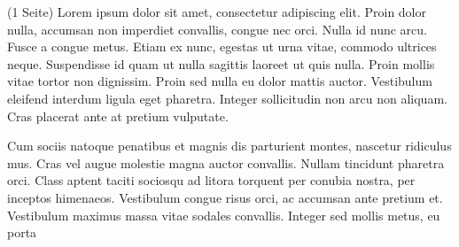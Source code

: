 (1 Seite)
Lorem ipsum dolor sit amet, consectetur adipiscing elit. Proin dolor nulla, accumsan non imperdiet convallis, congue nec orci. Nulla id nunc arcu. Fusce a congue metus. Etiam ex nunc, egestas ut urna vitae, commodo ultrices neque. Suspendisse id quam ut nulla sagittis laoreet ut quis nulla. Proin mollis vitae tortor non dignissim. Proin sed nulla eu dolor mattis auctor. Vestibulum eleifend interdum ligula eget pharetra. Integer sollicitudin non arcu non aliquam. Cras placerat ante at pretium vulputate.

Cum sociis natoque penatibus et magnis dis parturient montes, nascetur ridiculus mus. Cras vel augue molestie magna auctor convallis. Nullam tincidunt pharetra orci. Class aptent taciti sociosqu ad litora torquent per conubia nostra, per inceptos himenaeos. Vestibulum congue risus orci, ac accumsan ante pretium et. Vestibulum maximus massa vitae sodales convallis. Integer sed mollis metus, eu porta

\clearpage